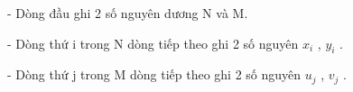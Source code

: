 - Dòng đầu ghi 2 số nguyên dương N và M.  

   - Dòng thứ i trong N dòng tiếp theo ghi 2 số nguyên $x_{i}$   , $y_{i}$   .  

   - Dòng thứ j trong M dòng tiếp theo ghi 2 số nguyên $u_{j}$   , $v_{j}$   .